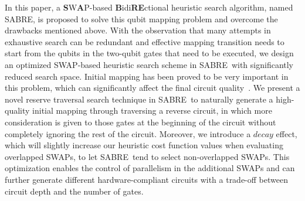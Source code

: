 \documentclass[journal,10pt,twocolumn]{IEEEtran}
\newcommand{\myalgorithmname}{SABRE}
\begin{document}
In this paper, a \textbf{S}W\textbf{A}P-based \textbf{B}idi\textbf{RE}ctional heuristic search algorithm, named \myalgorithmname, is proposed to solve this qubit mapping problem and overcome the drawbacks mentioned above.
With the observation that many attempts in exhaustive search can be redundant and effective mapping transition needs to start from the qubits in the two-qubit gates that need to be executed, 
we design an optimized SWAP-based heuristic search scheme in \myalgorithmname~with significantly reduced search space. %
Initial mapping has been proved to be very important in this problem, which can significantly affect the final circuit quality~\cite{siraichi2018qubit,zulehner2018efficient}.
We present a novel reserve traversal search technique in \myalgorithmname~to naturally generate a high-quality initial mapping through traversing a reverse circuit, in which more consideration is given to those gates at the beginning of the circuit without completely ignoring the rest of the circuit. %
Moreover, we introduce a $decay$ effect, which will slightly increase our heuristic cost function values when evaluating overlapped SWAPs, to let \myalgorithmname~tend to select non-overlapped SWAPs.
This optimization enables the control of parallelism in the additional SWAPs and can further generate different hardware-compliant circuits with a trade-off between circuit depth and the number of gates.
\end{document}
